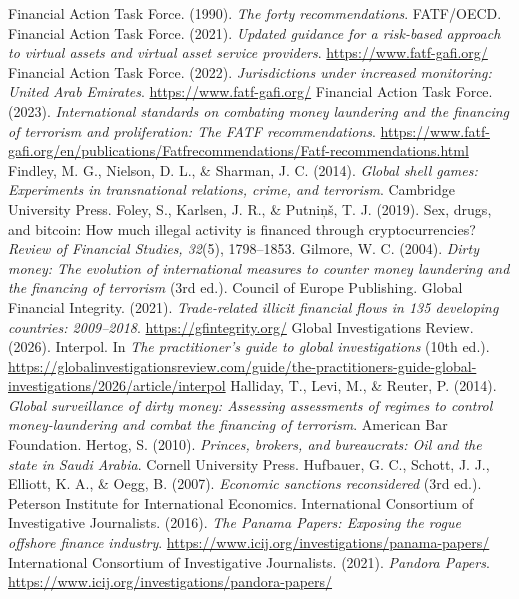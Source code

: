 \begin{referencelist}
   Financial Action Task Force. (1990). \emph{The forty recommendations}. FATF/OECD.
   Financial Action Task Force. (2021). \emph{Updated guidance for a risk-based approach to virtual assets and virtual asset service providers}. \url{https://www.fatf-gafi.org/}
   Financial Action Task Force. (2022). \emph{Jurisdictions under increased monitoring: United Arab Emirates}. \url{https://www.fatf-gafi.org/}
   Financial Action Task Force. (2023). \emph{International standards on combating money laundering and the financing of terrorism and proliferation: The FATF recommendations}. \url{https://www.fatf-gafi.org/en/publications/Fatfrecommendations/Fatf-recommendations.html}
   Findley, M. G., Nielson, D. L., \& Sharman, J. C. (2014). \emph{Global shell games: Experiments in transnational relations, crime, and terrorism}. Cambridge University Press.
   Foley, S., Karlsen, J. R., \& Putniņš, T. J. (2019). Sex, drugs, and bitcoin: How much illegal activity is financed through cryptocurrencies? \emph{Review of Financial Studies, 32}(5), 1798–1853.
   Gilmore, W. C. (2004). \emph{Dirty money: The evolution of international measures to counter money laundering and the financing of terrorism} (3rd ed.). Council of Europe Publishing.
   Global Financial Integrity. (2021). \emph{Trade-related illicit financial flows in 135 developing countries: 2009–2018}. \url{https://gfintegrity.org/}
   Global Investigations Review. (2026). Interpol. In \emph{The practitioner's guide to global investigations} (10th ed.). \url{https://globalinvestigationsreview.com/guide/the-practitioners-guide-global-investigations/2026/article/interpol}
   Halliday, T., Levi, M., \& Reuter, P. (2014). \emph{Global surveillance of dirty money: Assessing assessments of regimes to control money-laundering and combat the financing of terrorism}. American Bar Foundation.
   Hertog, S. (2010). \emph{Princes, brokers, and bureaucrats: Oil and the state in Saudi Arabia}. Cornell University Press.
   Hufbauer, G. C., Schott, J. J., Elliott, K. A., \& Oegg, B. (2007). \emph{Economic sanctions reconsidered} (3rd ed.). Peterson Institute for International Economics.
   International Consortium of Investigative Journalists. (2016). \emph{The Panama Papers: Exposing the rogue offshore finance industry}. \url{https://www.icij.org/investigations/panama-papers/}
   International Consortium of Investigative Journalists. (2021). \emph{Pandora Papers}. \url{https://www.icij.org/investigations/pandora-papers/}

\end{referencelist}

